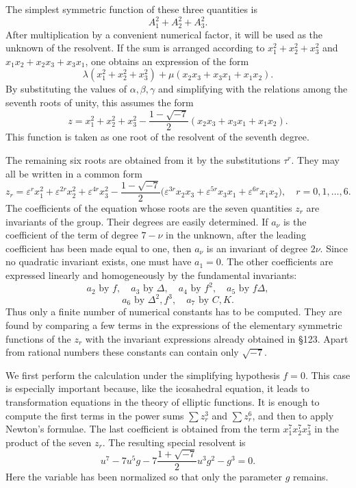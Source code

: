 \documentclass[11pt,a4paper]{book}
\newcommand{\eps}{\varepsilon}
\begin{document}
The simplest symmetric function of these three quantities is
\[
 A_1^2+A_2^2+A_3^2.
\]
After multiplication by a convenient numerical factor, it will be used as the unknown of the resolvent.  If the sum is arranged according to \(x_1^2+x_2^2+x_3^2\) and \(x_1x_2+x_2x_3+x_3x_1\), one obtains an expression of the form
\[
 \lambda(x_1^2+x_2^2+x_3^2)+\mu(x_2x_3+x_3x_1+x_1x_2).
\]
By substituting the values of \(\alpha,\beta,\gamma\) and simplifying with the relations among the seventh roots of unity, this assumes the form
\begin{equation}
 z=x_1^2+x_2^2+x_3^2-\frac{1-\sqrt{-7}}{2}(x_2x_3+x_3x_1+x_1x_2). \tag{2}
\end{equation}
This function is taken as one root of the resolvent of the seventh degree.

The remaining six roots are obtained from it by the substitutions \(\tau^r\).  They may all be written in a common form
\begin{equation}
 z_r=\eps^r x_1^2+\eps^{2r}x_2^2+\eps^{4r}x_3^2
 -\frac{1-\sqrt{-7}}{2}\bigl(\eps^{3r}x_2x_3+\eps^{5r}x_3x_1+\eps^{6r}x_1x_2\bigr),
 \quad r=0,1,\ldots,6. \tag{3}
\end{equation}
The coefficients of the equation whose roots are the seven quantities \(z_r\) are invariants of the group.  Their degrees are easily determined.  If \(a_\nu\) is the coefficient of the term of degree \(7-\nu\) in the unknown, after the leading coefficient has been made equal to one, then \(a_\nu\) is an invariant of degree \(2\nu\).  Since no quadratic invariant exists, one must have \(a_1=0\).  The other coefficients are expressed linearly and homogeneously by the fundamental invariants:
\[
 a_2 \text{ by } f,
\quad a_3 \text{ by } \Delta,
\quad a_4 \text{ by } f^2,
\quad a_5 \text{ by } f\Delta,
\]
\[
 a_6 \text{ by } \Delta^2, f^3,
\quad a_7 \text{ by } C,K.
\]
Thus only a finite number of numerical constants has to be computed.  They are found by comparing a few terms in the expressions of the elementary symmetric functions of the \(z_r\) with the invariant expressions already obtained in \S 123.  Apart from rational numbers these constants can contain only \(\sqrt{-7}\).

We first perform the calculation under the simplifying hypothesis \(f=0\).  This case is especially important because, like the icosahedral equation, it leads to transformation equations in the theory of elliptic functions.  It is enough to compute the first terms in the power sums \(\sum z_r^3\) and \(\sum z_r^6\), and then to apply Newton's formulae.  The last coefficient is obtained from the term \(x_1^7x_2^7x_3^7\) in the product of the seven \(z_r\).  The resulting special resolvent is
\begin{equation}
 u^7-7u^5g-7\frac{1+\sqrt{-7}}{2}u^3g^2-g^3=0. \tag{4}
\end{equation}
Here the variable has been normalized so that only the parameter \(g\) remains.
\end{document}
